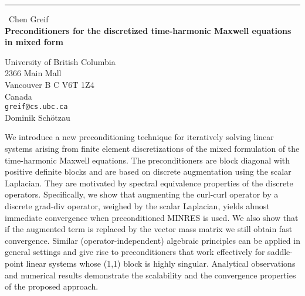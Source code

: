 \documentclass{report}
\begin{document}
\begin{center}
\rule{6in}{1pt} \
{\large Chen Greif \\
{\bf Preconditioners for the discretized time-harmonic Maxwell equations in mixed form}}

University of British Columbia \\ 2366 Main Mall \\ Vancouver B C V6T 1Z4 \\ Canada
\\
{\tt greif@cs.ubc.ca}\\
Dominik Sch\"otzau\end{center}

We introduce a new preconditioning technique for iteratively solving
linear systems arising from finite element discretizations of the mixed
formulation of the time-harmonic Maxwell equations. The preconditioners
are block diagonal with positive definite blocks and are based on
discrete augmentation using the scalar Laplacian. They are motivated by
spectral equivalence properties of the discrete operators. Specifically,
we show that augmenting the curl-curl operator by a discrete grad-div
operator, weighed by the scalar Laplacian, yields almost immediate
convergence when preconditioned MINRES is used. We also show that if the
augmented term is replaced by the vector mass matrix we still obtain fast
convergence. Similar (operator-independent) algebraic principles can be
applied in general settings and give rise to preconditioners that work
effectively for saddle-point linear systems whose (1,1) block is highly
singular. Analytical observations and numerical results demonstrate the
scalability and the convergence properties of the proposed approach.
\end{document}
